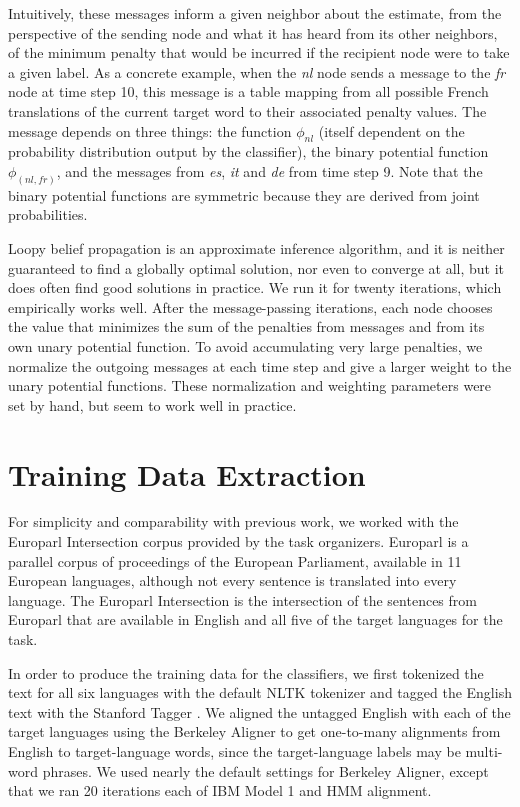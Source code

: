 \documentclass[11pt,letterpaper]{article}
\begin{document}
Intuitively, these messages inform a given neighbor about the estimate, from
the perspective of the sending node and what it has heard from its other
neighbors, of the minimum penalty that would be incurred if the recipient node
were to take a given label. As a concrete example, when the \emph{nl} node
sends a message to the \emph{fr} node at time step 10, this message is a table
mapping from all possible French translations of the current target word
to their associated penalty values. The message depends on three things: the
function $\phi_{nl}$ (itself dependent on the probability distribution output
by the classifier), the binary potential function $\phi_{(nl,fr)}$, and the
messages from \emph{es}, \emph{it} and \emph{de} from time step 9.  Note that
the binary potential functions are symmetric because they are derived from
joint probabilities.

Loopy belief propagation is an approximate inference algorithm, and it is
neither guaranteed to find a globally optimal solution, nor even to converge at
all, but it does often find good solutions in practice. We run it for twenty
iterations, which empirically works well. After the message-passing iterations,
each node chooses the value that minimizes the sum of the penalties from
messages and from its own unary potential function. To avoid accumulating very
large penalties, we normalize the outgoing messages at each time step and give
a larger weight to the unary potential functions. These normalization and
weighting parameters were set by hand, but seem to work well in practice.

\section{Training Data Extraction}
\label{extraction}
For simplicity and comparability with previous work, we worked with the
Europarl Intersection corpus provided by the task organizers. Europarl
\cite{europarl} is a parallel corpus of proceedings of the European Parliament,
available in 11 European languages, although not every sentence is translated
into every language. The Europarl Intersection is the intersection of the
sentences from Europarl that are available in English and all five of the
target languages for the task.

In order to produce the training data for the classifiers, we first tokenized
the text for all six languages with the default NLTK tokenizer and tagged the
English text with the Stanford Tagger
\cite{Toutanova03feature-richpart-of-speech}. We aligned the untagged English
with each of the target languages using the Berkeley Aligner
\cite{denero-klein:2007:ACLMain} to get one-to-many alignments from English to
target-language words, since the target-language labels may be multi-word
phrases. We used nearly the default settings for Berkeley Aligner, except that
we ran 20 iterations each of IBM Model 1 and HMM alignment.
\end{document}
